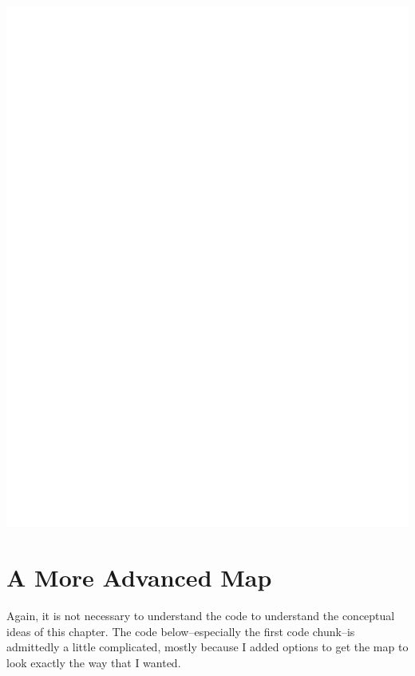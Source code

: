 \documentclass[
  letterpaper,
  DIV=11,
  numbers=noendperiod,
  oneside]{scrreprt}
\begin{document}
\includegraphics{projections_files/figure-pdf/unnamed-chunk-3-1.pdf}

\section{A More Advanced Map}\label{a-more-advanced-map}

\begin{tcolorbox}[enhanced jigsaw, opacityback=0, colback=white, toprule=.15mm, colframe=quarto-callout-note-color-frame, bottomrule=.15mm, title=\textcolor{quarto-callout-note-color}{\faInfo}\hspace{0.5em}{Note}, coltitle=black, toptitle=1mm, bottomtitle=1mm, arc=.35mm, breakable, colbacktitle=quarto-callout-note-color!10!white, left=2mm, rightrule=.15mm, titlerule=0mm, leftrule=.75mm, opacitybacktitle=0.6]

Again, it is not necessary to understand the code to understand the
conceptual ideas of this chapter. The code below--especially the first
code chunk--is admittedly a little complicated, mostly because I added
options to get the map to look exactly the way that I wanted.

\end{tcolorbox}
\end{document}
